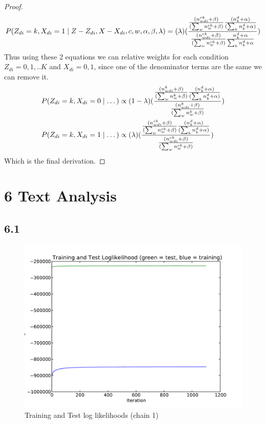 \documentclass{article}
\begin{document}
\begin{proof}
\begin{align*}
P(Z_{di} = k, X_{di} =1 \mid Z - Z_{di}, X - X_{di}, c, w, \alpha,\beta,\lambda) &= (\lambda) (\frac {\frac{(n^{ck}_{wdi} + \beta)}{( \sum_w n^{ck}_w + \beta)} \frac{(n^d_k + \alpha)}{(\sum_k n^d_k + \alpha)}}{\frac{(n^{ck}_{wdi} + \beta)}{(\sum_w n^{ck}_w + \beta)} \frac{n^d_k + \alpha}{\sum_k n^d_k + \alpha}})\\
\end{align*}
 Thus using these 2 equations we can relative weights for each condition $Z_{di} = 0,1,..K$ and $X_{di} = 0,1$, since one of the denominator terms are the same we can remove it.
\begin{align*}
P(Z_{di} = k, X_{di} =0 \mid \dots) &\propto (1-\lambda) (\frac {\frac{(n^{k}_{wdi} + \beta)}{( \sum_w n^k_w + \beta)} \frac{(n^d_k + \alpha)}{( \sum_k n^d_k + \alpha)}}{\frac{(n^{k}_{wdi} + \beta)}{(\sum_w n^k_w + \beta)} })\\
P(Z_{di} = k, X_{di} =1 \mid \dots) &\propto (\lambda) (\frac {\frac{(n^{ck}_{wdi} + \beta)}{( \sum_w n^{ck}_w + \beta)} \frac{(n^d_k + \alpha)}{(\sum_k n^d_k + \alpha)}}{\frac{(n^{ck}_{wdi} + \beta)}{(\sum_w n^{ck}_w + \beta)} })\\
\end{align*}
Which is the final derivation.
\end{proof}


\section*{6 Text Analysis}
\subsection*{6.1}

\begin{figure}[H]
  \caption{Training and Test log likelihoods (chain 1)}
  \centering
    \includegraphics[width=1.0\textwidth]{q6_p1_1.pdf}
\end{figure}
\end{document}

